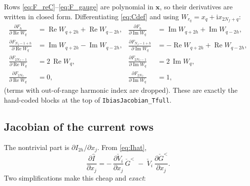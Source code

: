 \documentclass[11pt,a4paper]{article}
\newcommand{\ii}{\mathrm{i}}
\newcommand{\Real}{\operatorname{Re}}
\newcommand{\Imag}{\operatorname{Im}}
\newcommand{\Wm}{W}
\begin{document}
Rows \eqref{eq:F_reC}--\eqref{eq:F_gauge} are polynomial in $\mathbf x$, so their
derivatives are written in closed form.  Differentiating \eqref{eq:Cdef} and
using $\Wm_{r_q}=x_q+\ii x_{2N_f+q}$:
\begin{align}
  \frac{\partial F_h}{\partial \Real \Wm_q} &= \Real \Wm_{q+2h}+\Real \Wm_{q-2h},
  & \frac{\partial F_h}{\partial \Imag \Wm_q} &= \Imag \Wm_{q+2h}+\Imag \Wm_{q-2h},
  \label{eq:jac_reC}\\
  \frac{\partial F_{N_f-1+h}}{\partial \Real \Wm_q} &= \Imag \Wm_{q+2h}-\Imag \Wm_{q-2h},
  & \frac{\partial F_{N_f-1+h}}{\partial \Imag \Wm_q} &= -\Real \Wm_{q+2h}+\Real \Wm_{q-2h},
  \label{eq:jac_imC}\\
  \frac{\partial F_{2N_f-1}}{\partial \Real \Wm_q} &= 2\,\Real \Wm_q,
  & \frac{\partial F_{2N_f-1}}{\partial \Imag \Wm_q} &= 2\,\Imag \Wm_q,
  \label{eq:jac_norm}\\
  \frac{\partial F_{2N_f}}{\partial \Real \Wm_q} &= 0,
  & \frac{\partial F_{2N_f}}{\partial \Imag \Wm_q} &= 1,
  \label{eq:jac_gauge}
\end{align}
(terms with out-of-range harmonic index are dropped).  These are exactly the
hand-coded blocks at the top of \texttt{IbiasJacobian\_Tfull}.

\subsection{Jacobian of the current rows}

The nontrivial part is $\partial I_{2h}/\partial x_j$.  From \eqref{eq:Ihat},
\begin{equation}
  \frac{\partial \hat I}{\partial x_j}
  = -\,\frac{\partial \check V_i}{\partial x_j}\,\check G^<
    \;-\;\check V_i\,\frac{\partial \check G^<}{\partial x_j}.
  \label{eq:dIhat}
\end{equation}
Two simplifications make this cheap and \emph{exact}:
\end{document}
